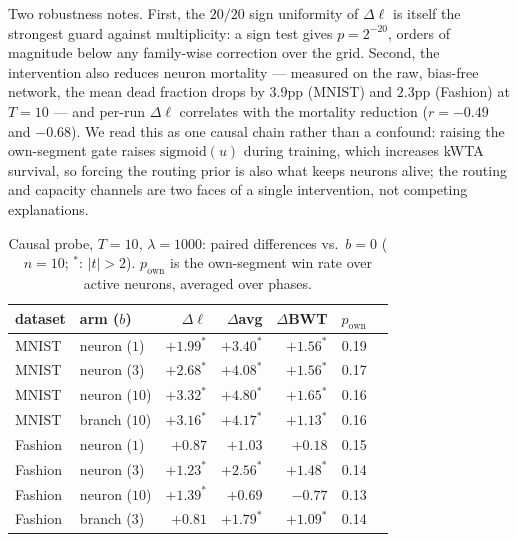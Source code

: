 \documentclass[review,12pt,number]{elsarticle}
\newcommand{\own}{p_{\mathrm{own}}}
\begin{document}
Two robustness notes. First, the $20/20$ sign uniformity of $\Delta\ell$
is itself the strongest guard against multiplicity: a sign test gives
$p = 2^{-20}$, orders of magnitude below any family-wise correction over
the grid. Second, the intervention also reduces neuron mortality ---
measured on the raw, bias-free network, the mean dead fraction drops by
$3.9$pp (MNIST) and $2.3$pp (Fashion) at $T{=}10$ --- and per-run
$\Delta\ell$ correlates with the mortality reduction ($r{=}-0.49$ and
$-0.68$). We read this as one causal chain rather than a confound:
raising the own-segment gate raises $\mathrm{sigmoid}(u)$ during
training, which increases kWTA survival, so forcing the routing prior is
also what keeps neurons alive; the routing and capacity channels are two
faces of a single intervention, not competing explanations.

\begin{table}[t]
\centering\small
\caption{Causal probe, $T{=}10$, $\lambda{=}1000$: paired differences vs.\
$b{=}0$ ($n{=}10$; $^{*}$: $|t|>2$). $\own$ is the own-segment win rate
over active neurons, averaged over phases.}
\label{tab:dose10}
\begin{tabular}{llrrrr r}
\toprule
dataset & arm ($b$) & $\Delta\ell$ & $\Delta$avg & $\Delta$BWT & $\own$ \\
\midrule
MNIST & neuron ($1$)  & $+1.99^{*}$ & $+3.40^{*}$ & $+1.56^{*}$ & 0.19 \\
MNIST & neuron ($3$)  & $+2.68^{*}$ & $+4.08^{*}$ & $+1.56^{*}$ & 0.17 \\
MNIST & neuron ($10$) & $+3.32^{*}$ & $+4.80^{*}$ & $+1.65^{*}$ & 0.16 \\
MNIST & branch ($10$) & $+3.16^{*}$ & $+4.17^{*}$ & $+1.13^{*}$ & 0.16 \\
Fashion & neuron ($1$)  & $+0.87$ & $+1.03$ & $+0.18$ & 0.15 \\
Fashion & neuron ($3$)  & $+1.23^{*}$ & $+2.56^{*}$ & $+1.48^{*}$ & 0.14 \\
Fashion & neuron ($10$) & $+1.39^{*}$ & $+0.69$ & $-0.77$ & 0.13 \\
Fashion & branch ($3$)  & $+0.81$ & $+1.79^{*}$ & $+1.09^{*}$ & 0.14 \\
\bottomrule
\end{tabular}
\end{table}
\end{document}
